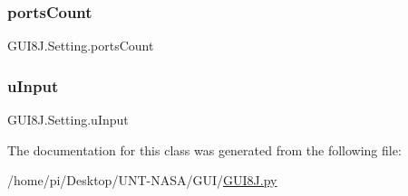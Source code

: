 \subsubsection{\texorpdfstring{ports\+Count}{portsCount}\hspace{0.1cm}{\footnotesize\ttfamily [2/2]}}
{\footnotesize\ttfamily G\+U\+I8\+J.\+Setting.\+ports\+Count}

\mbox{\label{classGUI8J_1_1Setting_a3a6044d92a6632b16f1c0c6c752b00f2}} 
\subsubsection{\texorpdfstring{u\+Input}{uInput}}
{\footnotesize\ttfamily G\+U\+I8\+J.\+Setting.\+u\+Input}



The documentation for this class was generated from the following file\+:\begin{DoxyCompactItemize}
\item 
/home/pi/\+Desktop/\+U\+N\+T-\/\+N\+A\+S\+A/\+G\+U\+I/\hyperlink{GUI8J_8py}{G\+U\+I8\+J.\+py}\end{DoxyCompactItemize}

